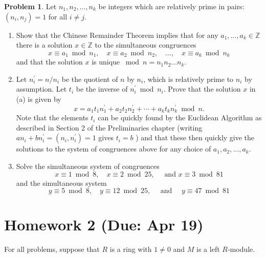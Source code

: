 \documentclass{amsart}
\numberwithin{equation}{section}
\theoremstyle{definition}
\newtheorem{problem}[thm]{Problem}
\begin{document}
\begin{problem}
Let \(n_1, n_2, \ldots, n_k\) be integers which are relatively prime in pairs: \(\left(n_i, n_j\right)=1\) for all \(i \neq j\).
\begin{enumerate}
\item Show that the Chinese Remainder Theorem implies that for any \(a_1, \ldots, a_k \in \mathbb{Z}\) there is a solution \(x \in \mathbb{Z}\) to the simultaneous congruences
\[
x \equiv a_1 \bmod n_1, \quad x \equiv a_2 \bmod n_2, \quad \ldots, \quad x \equiv a_k \bmod n_k
\]
and that the solution \(x\) is unique \(\bmod n = n_1 n_2 \ldots n_k\).
\item Let \(n_i^{\prime}=n / n_i\) be the quotient of \(n\) by \(n_i\), which is relatively prime to \(n_i\) by assumption. Let \(t_i\) be the inverse of \(n_i^{\prime} \bmod n_i\). Prove that the solution \(x\) in (a) is given by
\[
x=a_1 t_1 n_1^{\prime}+a_2 t_2 n_2^{\prime}+\cdots+a_k t_k n_k^{\prime} \bmod n .
\]
Note that the elements \(t_i\) can be quickly found by the Euclidean Algorithm as described in Section 2 of the Preliminaries chapter (writing \(a n_i+b n_i^{\prime}=\left(n_i, n_i^{\prime}\right)=1\) gives \(t_i=b\) ) and that these then quickly give the solutions to the system of congruences above for any choice of \(a_1, a_2, \ldots, a_k\).

\item Solve the simultaneous system of congruences
\[
x \equiv 1 \bmod 8, \quad x \equiv 2 \bmod 25, \quad \text { and } x \equiv 3 \bmod 81
\]
and the simultaneous system
\[
y \equiv 5 \bmod 8, \quad y \equiv 12 \bmod 25, \quad \text { and } \quad y \equiv 47 \bmod 81
\]
\end{enumerate}
\end{problem}




\newpage
\section{Homework 2 (Due: Apr 19)}

For all problems, suppose that \( R \) is a ring with \( 1\ne0 \)
and \( M \) is a left \( R \)-module.
\end{document}
